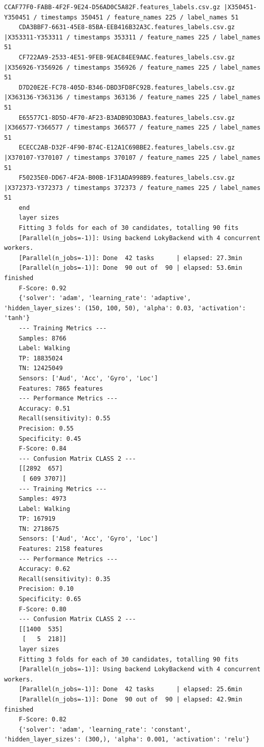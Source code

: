 \documentclass{UoNMCHA}
\numberwithin{equation}{section}
\begin{document}
\begin{lstlisting}[breaklines=true]
    CCAF77F0-FABB-4F2F-9E24-D56AD0C5A82F.features_labels.csv.gz |X350451-Y350451 / timestamps 350451 / feature_names 225 / label_names 51
    CDA3BBF7-6631-45E8-85BA-EEB416B32A3C.features_labels.csv.gz |X353311-Y353311 / timestamps 353311 / feature_names 225 / label_names 51
    CF722AA9-2533-4E51-9FEB-9EAC84EE9AAC.features_labels.csv.gz |X356926-Y356926 / timestamps 356926 / feature_names 225 / label_names 51
    D7D20E2E-FC78-405D-B346-DBD3FD8FC92B.features_labels.csv.gz |X363136-Y363136 / timestamps 363136 / feature_names 225 / label_names 51
    E65577C1-8D5D-4F70-AF23-B3ADB9D3DBA3.features_labels.csv.gz |X366577-Y366577 / timestamps 366577 / feature_names 225 / label_names 51
    ECECC2AB-D32F-4F90-B74C-E12A1C69BBE2.features_labels.csv.gz |X370107-Y370107 / timestamps 370107 / feature_names 225 / label_names 51
    F50235E0-DD67-4F2A-B00B-1F31ADA998B9.features_labels.csv.gz |X372373-Y372373 / timestamps 372373 / feature_names 225 / label_names 51
    end
    layer sizes
    Fitting 3 folds for each of 30 candidates, totalling 90 fits
    [Parallel(n_jobs=-1)]: Using backend LokyBackend with 4 concurrent workers.
    [Parallel(n_jobs=-1)]: Done  42 tasks      | elapsed: 27.3min
    [Parallel(n_jobs=-1)]: Done  90 out of  90 | elapsed: 53.6min finished
    F-Score: 0.92
    {'solver': 'adam', 'learning_rate': 'adaptive', 'hidden_layer_sizes': (150, 100, 50), 'alpha': 0.03, 'activation': 'tanh'}
    --- Training Metrics ---
    Samples: 8766
    Label: Walking
    TP: 18835024
    TN: 12425049
    Sensors: ['Aud', 'Acc', 'Gyro', 'Loc']
    Features: 7865 features
    --- Performance Metrics ---
    Accuracy: 0.51
    Recall(sensitivity): 0.55
    Precision: 0.55
    Specificity: 0.45
    F-Score: 0.84
    --- Confusion Matrix CLASS 2 ---
    [[2892  657]
     [ 609 3707]]
    --- Training Metrics ---
    Samples: 4973
    Label: Walking
    TP: 167919
    TN: 2718675
    Sensors: ['Aud', 'Acc', 'Gyro', 'Loc']
    Features: 2158 features
    --- Performance Metrics ---
    Accuracy: 0.62
    Recall(sensitivity): 0.35
    Precision: 0.10
    Specificity: 0.65
    F-Score: 0.80
    --- Confusion Matrix CLASS 2 ---
    [[1400  535]
     [   5  218]]
    layer sizes
    Fitting 3 folds for each of 30 candidates, totalling 90 fits
    [Parallel(n_jobs=-1)]: Using backend LokyBackend with 4 concurrent workers.
    [Parallel(n_jobs=-1)]: Done  42 tasks      | elapsed: 25.6min
    [Parallel(n_jobs=-1)]: Done  90 out of  90 | elapsed: 42.9min finished
    F-Score: 0.82
    {'solver': 'adam', 'learning_rate': 'constant', 'hidden_layer_sizes': (300,), 'alpha': 0.001, 'activation': 'relu'}

\end{lstlisting}
\end{document}
